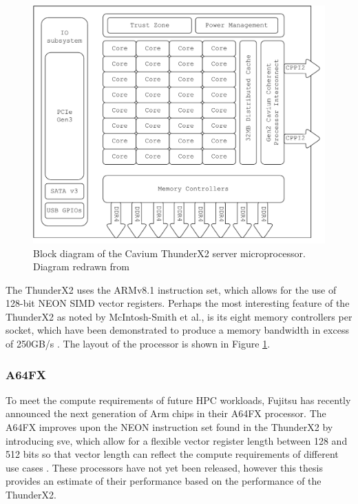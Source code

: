 \documentclass[a4paper,11pt]{report}
\begin{document}
\begin{figure}[htbp]
\begin{center}
\includegraphics[width=1\textwidth]{img/thunderx2.pdf}
\caption[Block diagram of the Cavium ThunderX2 server microprocessor]{Block diagram of the Cavium ThunderX2 server microprocessor. Diagram redrawn from \cite{thunderprocessor2018brief}}
\label{fig:thunderx2}
\end{center}
\end{figure}
\par
The ThunderX2 uses the ARMv8.1 instruction set, which allows for the use of 128-bit NEON SIMD vector registers. Perhaps the most interesting feature of the ThunderX2 as noted by McIntosh-Smith et al., is its eight memory controllers per socket, which have been demonstrated to produce a memory bandwidth in excess of 250GB/s \cite{mcintosh2018performance}. The layout of the processor is shown in Figure \ref{fig:thunderx2}.

\subsubsection{A64FX}
To meet the compute requirements of future HPC workloads, Fujitsu has recently announced the next generation of Arm chips in their A64FX processor. The A64FX improves upon the NEON instruction set found in the ThunderX2 by introducing \gls{sve}, which allow for a flexible vector register length between 128 and 512 bits so that vector length can reflect the compute requirements of different use cases \cite{stephens2017arm, rico2017arm}. These processors have not yet been released, however this thesis provides an estimate of their performance based on the performance of the ThunderX2.
\end{document}
